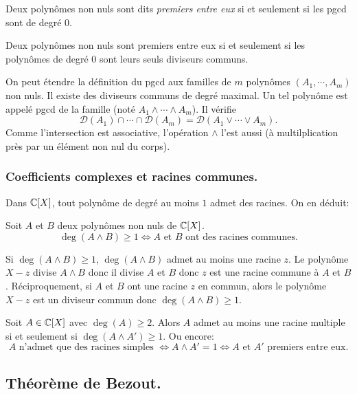 \begin{defi}
 Deux polynômes non nuls sont dits \emph{premiers entre eux} si et seulement si les pgcd sont de degré $0$.
\end{defi}
\begin{rem}
 Deux polynômes non nuls sont premiers entre eux si et seulement si les polynômes de degré $0$ sont leurs seuls diviseurs communs. 
\end{rem}


On peut étendre la définition du pgcd aux familles de $m$ polynômes $(A_1, \cdots, A_m)$ non nuls. Il existe des diviseurs communs de degré maximal. Un tel polynôme est appelé pgcd de la famille (noté $A_1 \wedge \cdots \wedge A_m$). Il vérifie
\[
 \mathcal{D}(A_1) \cap \cdots \cap \mathcal{D}(A_m) = \mathcal{D}(A_1 \vee \cdots \vee A_m).
\]
Comme l'intersection est associative, l'opération $\wedge$ l'est aussi (à multilplication près par un élément non nul du corps).

\subsubsection{Coefficients complexes et racines communes.}
Dans $\mathbb{C}[X]$, tout polynôme de degré au moins $1$ admet des racines. On en déduit:
\begin{prop}
 Soit $A$ et $B$ deux polynômes non nuls de $\mathbb{C}[X]$.
\[
 \deg(A\wedge B) \geq 1 \Leftrightarrow A \text{ et } B \text{ ont des racines communes.}
\]
\end{prop}
\begin{demo}
 Si $\deg(A\wedge B) \geq 1$, $\deg(A\wedge B)$ admet au moins une racine $z$. Le polynôme $X-z$ divise $A\wedge B$ donc il divise $A$ et $B$ donc $z$ est une racine commune à $A$ et $B$.\newline
 Réciproquement, si $A$ et $B$ ont une racine $z$ en commun, alors le polynôme $X-z$ est un diviseur commun donc $\deg(A\wedge B)\geq 1$.
\end{demo}

\begin{rem}
 Soit $A\in \mathbb{C}[X]$ avec $\deg(A)\geq 2$. Alors $A$ admet au moins une racine multiple si et seulement si $\deg(A\wedge A') \geq 1$. Ou encore: 
\[
 A \text{ n'admet que des racines simples } \Leftrightarrow A \wedge A' = 1 \Leftrightarrow A \text{ et } A' \text{ premiers entre eux}.
\]
\end{rem}

\subsection{Théorème de Bezout.}
